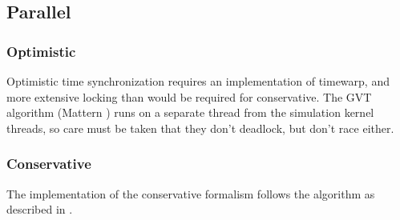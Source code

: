 \documentclass[8pt,a4paper]{report}
\begin{document}
\subsection{Parallel}
\subsubsection{Optimistic}
Optimistic time synchronization requires an implementation of timewarp, and more extensive locking than would be required for conservative. The GVT algorithm (Mattern \cite{Mattern}) runs on a separate thread from the simulation kernel threads, so care must be taken that they don't deadlock, but don't race either.
\subsubsection{Conservative}
The implementation of the conservative formalism follows the algorithm as described in \cite{cons}. \\
\end{document}
